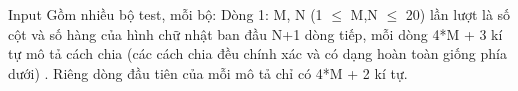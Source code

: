 Input
Gồm nhiều bộ test, mỗi bộ: Dòng 1: M, N (1 $\le$ M,N $\le$ 20) lần lượt là số cột và số hàng của hình chữ nhật ban đầu N+1 dòng tiếp, mỗi dòng 4*M + 3 kí tự mô tả cách chia (các cách chia đều chính xác và có dạng hoàn toàn giống phía dưới) . Riêng dòng đầu tiên của mỗi mô tả chỉ có 4*M + 2 kí tự.